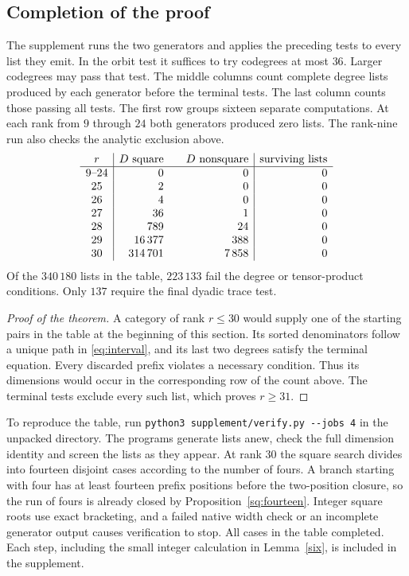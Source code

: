 \documentclass[11pt]{amsart}
\numberwithin{equation}{section}
\begin{document}
\subsection{Completion of the proof}
The supplement runs the two generators and applies the preceding
tests to every list they emit. In the orbit test it suffices to try
codegrees at most $36$. Larger codegrees may pass that test.
The middle columns count complete degree lists produced by each
generator before the terminal tests. The last column counts those
passing all tests. The first row groups sixteen separate computations.
At each rank from $9$ through $24$ both generators produced zero lists.
The rank-nine run also checks the analytic exclusion above.
\[
\begin{array}{c|r@{\qquad}r|r}
 r & D\text{ square}&D\text{ nonsquare}&
                \text{surviving lists}\\ \hline
 9\text{--}24 &0&0&0\\
 25&2&0&0\\
 26&4&0&0\\
 27&36&1&0\\
 28&789&24&0\\
 29&16\,377&388&0\\
 30&314\,701&7\,858&0
\end{array}
\]
Of the $340\,180$ lists in the table, $223\,133$ fail the degree or
tensor-product conditions. Only $137$ require the final dyadic trace
test.
\begin{proof}[Proof of the theorem]
A category of rank $r\le30$ would supply one of the starting
pairs in the table at the beginning of this section. Its sorted
denominators follow a unique path in \eqref{eq:interval}, and its
last two degrees satisfy the terminal equation. Every discarded
prefix violates a necessary condition. Thus its dimensions would
occur in the corresponding row of the count above. The terminal
tests exclude every such list, which proves $r\ge31$.
\end{proof}

To reproduce the table, run
\verb|python3 supplement/verify.py --jobs 4| in the unpacked
directory. The programs generate lists anew, check the full dimension
identity and screen the lists as they appear. At rank $30$ the square
search divides into fourteen disjoint cases according to the number
of fours. A branch starting with four has at least fourteen prefix
positions before the two-position closure, so the run of fours is
already closed by Proposition~\ref{sq:fourteen}. Integer square
roots use exact bracketing, and a failed native width check or an
incomplete generator output causes verification to stop. All cases
in the table completed. Each step, including the small integer
calculation in Lemma~\ref{six}, is included in the supplement.
\end{document}
